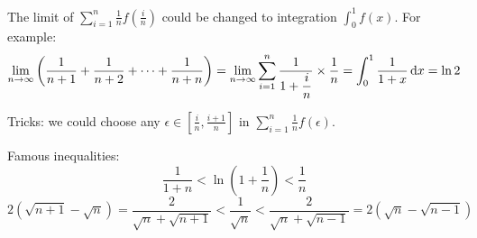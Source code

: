 \begin{example}
    The limit of $\displaystyle \sum_{i=1}^n \frac{1}{n}f\left(\frac{i}{n}\right)$ could be changed to integration $\displaystyle \int_{0}^1 f(x)$. For example:
    \begin{equation}
        \lim_{n \rightarrow \infty} \left( \frac{1}{n+1} + \frac{1}{n+2} + \cdots + \frac{1}{n+n} \right) = \lim_{n \rightarrow \infty} \sum_{i=1}^n \frac{1}{\displaystyle 1+\frac{i}{n}} \times \frac{1}{n} = \int_0^1 \frac{1}{1+x} \dif x = \ln 2
    \end{equation}
    
    Tricks: we could choose any $\epsilon \in \left[\frac{i}{n}, \frac{i+1}{n}\right]$ in $\displaystyle \sum_{i=1}^n \frac{1}{n}f(\epsilon)$.
\end{example}


\begin{example}
    Famous inequalities:
    \begin{equation}
        \frac{1}{1+n} < \ln \left(1+\frac{1}{n} \right) < \frac{1}{n}
    \end{equation}
    \begin{equation}
        2(\sqrt{n+1} - \sqrt{n}) = \frac{2}{\sqrt{n} + \sqrt{n+1}} < \frac{1}{\sqrt{n}} < \frac{2}{\sqrt{n} + \sqrt{n-1}} = 2(\sqrt{n} - \sqrt{n-1} )
    \end{equation}
\end{example}

